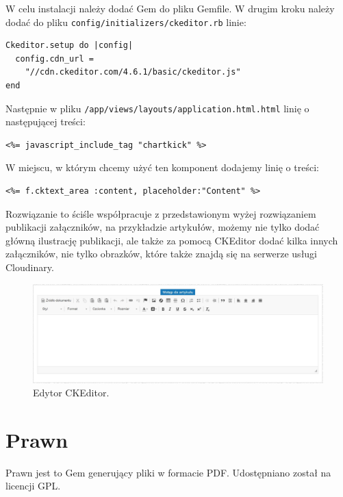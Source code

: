 \documentclass[openright]{xmgr}
\begin{document}
W celu instalacji należy dodać Gem do pliku Gemfile. W drugim kroku należy dodać do pliku \texttt{config/initializers/ckeditor.rb} linie:
\begin{lstlisting}[language=ruby2, caption={Fragment zawartości pliku ckeditor.rb}]
Ckeditor.setup do |config|
  config.cdn_url =
	"//cdn.ckeditor.com/4.6.1/basic/ckeditor.js"
end
\end{lstlisting}

\newpage

Następnie w pliku \texttt{/app/views/layouts/application.html.html} linię o następującej treści:
\begin{lstlisting}[language=ruby2, caption={Fragment zawartości pliku application.html.rb}]
<%= javascript_include_tag "chartkick" %>
\end{lstlisting}
W miejscu, w którym chcemy użyć ten komponent dodajemy linię o treści:
\begin{lstlisting}[language=ruby2, caption={Kod uruchamiający edytor}]
<%= f.cktext_area :content, placeholder:"Content" %>
\end{lstlisting}
Rozwiązanie to ściśle współpracuje z przedstawionym wyżej rozwiązaniem publikacji załączników, na przykładzie artykułów, możemy nie tylko dodać główną ilustrację publikacji, ale także za pomocą CKEditor dodać kilka innych załączników, nie tylko obrazków, które także znajdą się na serwerze usługi Cloudinary.

\begin{figure}[!tbh]
\centering
\includegraphics[width=\linewidth]{fig/ckeditor}
\caption{Edytor CKEditor.}
\end{figure}

\newpage

\section{Prawn}
Prawn \cite{prawn} jest to Gem generujący pliki w formacie PDF. Udostępniano został na licencji GPL.
\end{document}
